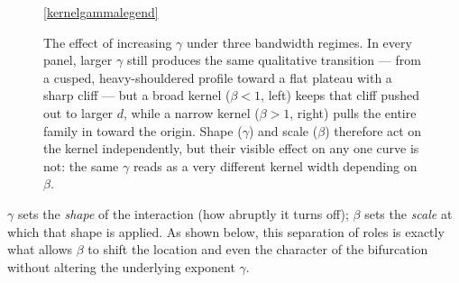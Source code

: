 \documentclass[11pt,a4paper]{article}
\theoremstyle{plain}
\theoremstyle{definition}
\theoremstyle{remark}
\newcommand{\bw}{\beta}
\begin{document}
\begin{figure}[H]
\centering
{}

\vspace{2mm}
\centering\ref{kernelgammalegend}
\caption{The effect of increasing $\gamma$ under three bandwidth regimes. In
every panel, larger $\gamma$ still produces the same qualitative
transition — from a cusped, heavy-shouldered profile toward a flat plateau
with a sharp cliff — but a broad kernel ($\bw<1$, left) keeps that cliff
pushed out to larger $d$, while a narrow kernel ($\bw>1$, right) pulls the
entire family in toward the origin. Shape ($\gamma$) and scale ($\bw$)
therefore act on the kernel independently, but their visible effect on any
one curve is not: the same $\gamma$ reads as a very different kernel width
depending on $\bw$.}
\label{fig:kernel_gamma_by_beta}
\end{figure}

\begin{keybox}
$\gamma$ sets the \emph{shape} of the interaction (how abruptly it turns
off); $\bw$ sets the \emph{scale} at which that shape is applied. As shown
below, this separation of roles is exactly what allows $\bw$ to shift the
location and even the character of the bifurcation without altering the
underlying exponent $\gamma$.
\end{keybox}
\end{document}
